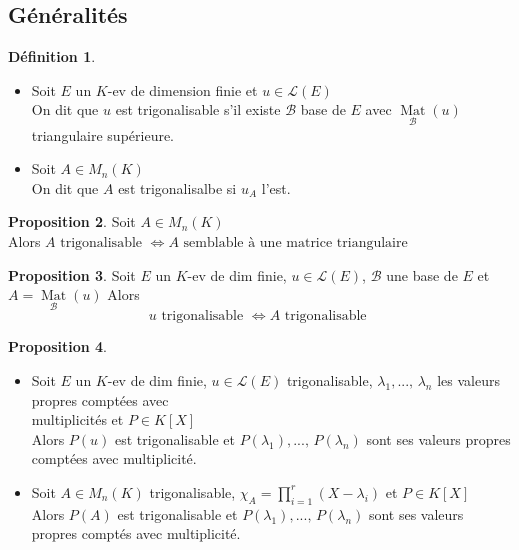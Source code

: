 \documentclass[10pt,a4paper]{article}
\theoremstyle{definition}
\newtheorem{proposition}{Proposition}[section]
\newtheorem{definition}[proposition]{Définition}
\DeclareMathOperator*{\Mat}{Mat}
\begin{document}
\subsection{Généralités}
\begin{definition}
\hfill \begin{itemize}
\item Soit $E$ un $K$-ev de dimension finie et $u \in \mathcal{L}(E)$ \\
On dit que $u$ est trigonalisable s'il existe $\mathcal{B}$ base de $E$ avec $\Mat\limits_{\mathcal{B}}(u)$ triangulaire supérieure.
\item Soit $A \in M_n(K)$ \\
On dit que $A$ est trigonalisalbe si $u_A$ l'est.
\end{itemize}
\end{definition}
\begin{proposition}
Soit $A \in M_n(K)$ \\
Alors $A \text{ trigonalisable } \iff A \text{ semblable à une matrice triangulaire }$
\end{proposition}
\begin{proposition}
Soit $E$ un $K$-ev de dim finie, $u \in \mathcal{L}(E)$, $\mathcal{B}$ une base de $E$ et $A = \Mat\limits_{\mathcal{B}}(u)$
Alors 
\[ \boxed{ u \text{ trigonalisable } \iff A \text{ trigonalisable }} \]
\end{proposition}
\begin{proposition}
\hfill \begin{itemize}
\item Soit $E$ un $K$-ev de dim finie, $u \in \mathcal{L}(E)$ trigonalisable, $\lambda_1, ...,\, \lambda_n$ les valeurs propres comptées avec  \\
multiplicités et $P \in K[X]$ \\
Alors $P(u)$ est trigonalisable et $P(\lambda_1), ...,\, P(\lambda_n)$ sont ses valeurs propres comptées avec multiplicité.
\item Soit $A \in M_n(K)$ trigonalisable, $\chi_A = \prod\limits_{i = 1}^r (X - \lambda_i)$ et $P \in K[X]$ \\
Alors $P(A)$ est trigonalisable et $P(\lambda_1), ...,\, P(\lambda_n)$ sont ses valeurs propres comptés avec multiplicité.
\end{itemize}
\end{proposition}
\end{document}
